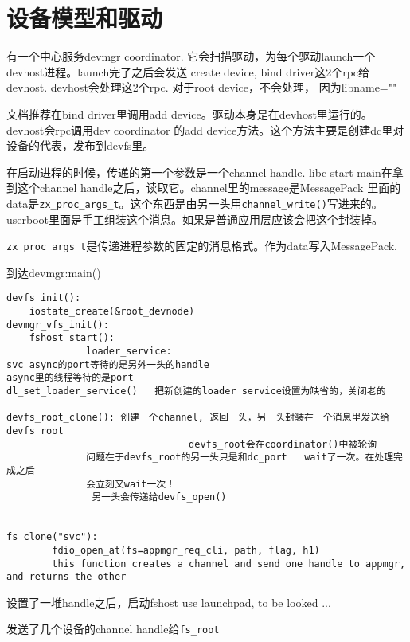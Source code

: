 \section{设备模型和驱动}
有一个中心服务devmgr coordinator. 它会扫描驱动，为每个驱动launch一个devhost进程。launch完了之后会发送
create device, bind driver这2个rpc给devhost. devhost会处理这2个rpc. 对于root device，不会处理，
因为libname=""

文档推荐在bind driver里调用add device。驱动本身是在devhost里运行的。devhost会rpc调用dev coordinator
的add device方法。这个方法主要是创建dc里对设备的代表，发布到devfs里。


在启动进程的时候，传递的第一个参数是一个channel handle.
libc start main在拿到这个channel handle之后，读取它。channel里的message是MessagePack
里面的data是\verb|zx_proc_args_t|。这个东西是由另一头用\verb|channel_write()|写进来的。
userboot里面是手工组装这个消息。如果是普通应用层应该会把这个封装掉。

\verb|zx_proc_args_t|是传递进程参数的固定的消息格式。作为data写入MessagePack.


到达devmgr:main()
\begin{verbatim}
devfs_init():
    iostate_create(&root_devnode)
devmgr_vfs_init():
    fshost_start():
              loader_service:
svc async的port等待的是另外一头的handle
async里的线程等待的是port
dl_set_loader_service()   把新创建的loader service设置为缺省的，关闭老的

devfs_root_clone(): 创建一个channel, 返回一头，另一头封装在一个消息里发送给devfs_root
                                devfs_root会在coordinator()中被轮询
              问题在于devfs_root的另一头只是和dc_port   wait了一次。在处理完成之后
              会立刻又wait一次！
               另一头会传递给devfs_open()


fs_clone("svc"): 
        fdio_open_at(fs=appmgr_req_cli, path, flag, h1)
        this function creates a channel and send one handle to appmgr, and returns the other 
\end{verbatim}

设置了一堆handle之后，启动fshost      
use launchpad, to be looked ...
    
发送了几个设备的channel handle给\verb|fs_root|



